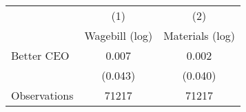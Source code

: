 {
\def\sym#1{\ifmmode^{#1}\else\(^{#1}\)\fi}
\begin{tabular}{l*{2}{c}}
\hline\hline
                    &\multicolumn{1}{c}{(1)}&\multicolumn{1}{c}{(2)}\\
                    &\multicolumn{1}{c}{Wagebill (log)}&\multicolumn{1}{c}{Materials (log)}\\
\hline
Better CEO          &       0.007         &       0.002         \\
                    &     (0.043)         &     (0.040)         \\
\hline
Observations        &       71217         &       71217         \\
\hline\hline
\end{tabular}
}
